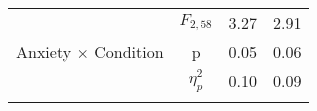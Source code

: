 \begin{table}[t!]
\begin{tabular}{lccc}
\multicolumn{1}{l|}{\multirow{3}{*}{Anxiety $\times$ Condition}} & $F_{2, 58}$          & 3.27                     & 2.91                     \\
\multicolumn{1}{l|}{}                                            & p                    & 0.05                     & 0.06                     \\
\multicolumn{1}{l|}{}                                            & $\eta^2_{p}$         & 0.10                     & 0.09                     \\
                                                                 & \multicolumn{1}{l}{} & \multicolumn{1}{l}{}     & \multicolumn{1}{l}{}    
\end{tabular}%

\label{tab:anxiety_anova}
\end{table}